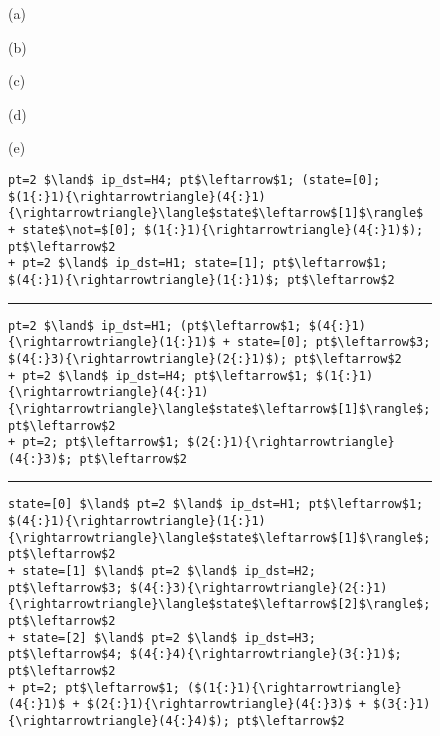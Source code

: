 \documentclass[pldi-cameraready]{sigplanconf}
\begin{document}
\newcommand{\thehrule}{\vspace{6pt}\hrule\vspace{6pt}}\begin{figure}[t]
\begin{minipage}{.1\linewidth}
\vspace{-1.0cm}
(a)

\vspace{1.25cm}

(b)

\vspace{1.75cm}
(c)

\vspace{2.75cm}
(d)

\vspace{3.0cm}
(e)
\end{minipage}\begin{minipage}{.9\linewidth}
\begin{lstlisting}[mathescape]
pt=2 $\land$ ip_dst=H4; pt$\leftarrow$1; (state=[0]; $(1{:}1){\rightarrowtriangle}(4{:}1){\rightarrowtriangle}\langle$state$\leftarrow$[1]$\rangle$ + state$\not=$[0]; $(1{:}1){\rightarrowtriangle}(4{:}1)$); pt$\leftarrow$2
+ pt=2 $\land$ ip_dst=H1; state=[1]; pt$\leftarrow$1; $(4{:}1){\rightarrowtriangle}(1{:}1)$; pt$\leftarrow$2
\end{lstlisting}
\thehrule
\begin{lstlisting}[mathescape]
pt=2 $\land$ ip_dst=H1; (pt$\leftarrow$1; $(4{:}1){\rightarrowtriangle}(1{:}1)$ + state=[0]; pt$\leftarrow$3; $(4{:}3){\rightarrowtriangle}(2{:}1)$); pt$\leftarrow$2
+ pt=2 $\land$ ip_dst=H4; pt$\leftarrow$1; $(1{:}1){\rightarrowtriangle}(4{:}1){\rightarrowtriangle}\langle$state$\leftarrow$[1]$\rangle$; pt$\leftarrow$2
+ pt=2; pt$\leftarrow$1; $(2{:}1){\rightarrowtriangle}(4{:}3)$; pt$\leftarrow$2
\end{lstlisting}
\thehrule
\begin{lstlisting}[mathescape]
state=[0] $\land$ pt=2 $\land$ ip_dst=H1; pt$\leftarrow$1; $(4{:}1){\rightarrowtriangle}(1{:}1){\rightarrowtriangle}\langle$state$\leftarrow$[1]$\rangle$; pt$\leftarrow$2
+ state=[1] $\land$ pt=2 $\land$ ip_dst=H2; pt$\leftarrow$3; $(4{:}3){\rightarrowtriangle}(2{:}1){\rightarrowtriangle}\langle$state$\leftarrow$[2]$\rangle$; pt$\leftarrow$2
+ state=[2] $\land$ pt=2 $\land$ ip_dst=H3; pt$\leftarrow$4; $(4{:}4){\rightarrowtriangle}(3{:}1)$; pt$\leftarrow$2
+ pt=2; pt$\leftarrow$1; ($(1{:}1){\rightarrowtriangle}(4{:}1)$ + $(2{:}1){\rightarrowtriangle}(4{:}3)$ + $(3{:}1){\rightarrowtriangle}(4{:}4)$); pt$\leftarrow$2
\end{lstlisting}

\end{minipage}
\end{figure}
\end{document}
